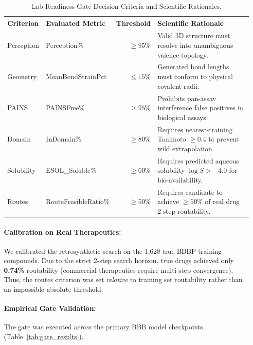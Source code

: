\documentclass[12pt, a4paper]{article}
\begin{document}
\begin{table}[H]
\centering
\small
\caption{Lab-Readiness Gate Decision Criteria and Scientific Rationales.}
\label{tab:gate_criteria}
\begin{tabular}{llrp{8.5cm}}
\toprule
\textbf{Criterion} & \textbf{Evaluated Metric} & \textbf{Threshold} & \textbf{Scientific Rationale} \\
\midrule
Perception & Perception\% & $\geq 95\%$ & Valid 3D structure must resolve into unambiguous valence topology. \\
Geometry & MeanBondStrainPct & $\leq 15\%$ & Generated bond lengths must conform to physical covalent radii. \\
PAINS & PAINSFree\% & $\geq 95\%$ & Prohibits pan-assay interference false positives in biological assays. \\
Domain & InDomain\% & $\geq 80\%$ & Requires nearest-training Tanimoto $\geq 0.4$ to prevent wild extrapolation. \\
Solubility & ESOL\_Soluble\% & $\geq 60\%$ & Requires predicted aqueous solubility $\log S > -4.0$ for bio-availability. \\
Routes & RouteFeasibleRatio\% & $\geq 50\%$ & Requires candidate to achieve $\geq 50\%$ of real drug 2-step routability. \\
\bottomrule
\end{tabular}
\end{table}

\paragraph{Calibration on Real Therapeutics:} We calibrated the retrosynthetic search on the 1,628 true BBBP training compounds. Due to the strict 2-step search horizon, true drugs achieved only \textbf{0.74\%} routability (commercial therapeutics require multi-step convergence). Thus, the routes criterion was set \textit{relative} to training set routability rather than an impossible absolute threshold.

\paragraph{Empirical Gate Validation:} The gate was executed across the primary BBB model checkpoints (Table~\ref{tab:gate_results}).
\end{document}

